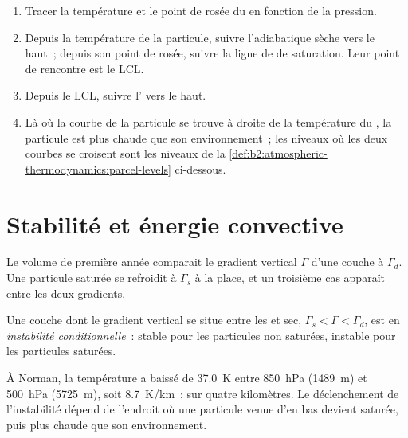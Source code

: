 \begin{method}\label{met:b2:atmospheric-thermodynamics:lift}
\begin{enumerate}
  \item Tracer la température et le point de rosée du  en fonction de la pression.
  \item Depuis la température de la particule, suivre l'adiabatique sèche vers le haut~; depuis son point de rosée,
        suivre la ligne de  de saturation. Leur point de rencontre est le LCL.
  \item Depuis le LCL, suivre l' vers le haut.
  \item Là où la courbe de la particule se trouve à droite de la température du , la
        particule est plus chaude que son environnement~; les niveaux où les deux courbes se croisent
        sont les niveaux de la \cref{def:b2:atmospheric-thermodynamics:parcel-levels} ci-dessous.
\end{enumerate}
\end{method}


\section{Stabilité et énergie convective}\label{sec:b2:atmospheric-thermodynamics:stability}

Le volume de première année comparait le gradient vertical $\Gamma$ d'une couche à $\Gamma_d$. Une particule
saturée se refroidit à $\Gamma_s$ à la place, et un troisième cas apparaît entre les deux gradients.

\begin{definition}\label{def:b2:atmospheric-thermodynamics:instability}
Une couche dont le gradient vertical se situe entre les  et sec,
$\Gamma_s < \Gamma < \Gamma_d$, est en \emph{instabilité conditionnelle}~:
stable pour les particules non saturées, instable pour les particules saturées.
\end{definition}

À Norman, la température a baissé de \qty{37.0}{K} entre \qty{850}{hPa} (\qty{1489}{m})
et \qty{500}{hPa} (\qty{5725}{m}), soit \qty{8.7}{K/km}~: 
sur quatre kilomètres. Le déclenchement de l'instabilité dépend de l'endroit où
une particule venue d'en bas devient saturée, puis plus chaude que son environnement.

